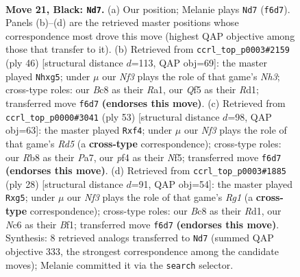 \documentclass[11pt]{article}
\begin{document}
\clearpage

\begin{figure}[p]\centering
\begin{subfigure}{0.46\textwidth}\centering
\resizebox{\linewidth}{!}{%
\newchessgame
\chessboard[
  setfen={1rb1r1k1/p1p2pp1/2n2n1p/p4q1P/2P2P1R/2P1P3/8/R1BQKBN1 b Q - 5 21},
  showmover=false,
  pgfstyle=straightmove, color=movearrow, markmove={f6-d7}
]}
\caption{}
\end{subfigure}\hfill
\begin{subfigure}{0.46\textwidth}\centering
\resizebox{\linewidth}{!}{%
\newchessgame
\chessboard[
  setfen={2bqr1k1/2p5/p1n4p/5pp1/1rp5/3p1NPN/P4PBP/R1QR2K1 w - - 2 24},
  showmover=false,
  pgfstyle=straightmove, color=movearrow, markmove={h3-g5}
]}
\caption{}
\end{subfigure}
\\[4pt]
\begin{subfigure}{0.46\textwidth}\centering
\resizebox{\linewidth}{!}{%
\newchessgame
\chessboard[
  setfen={2r3k1/ppq2pp1/4pn2/1PP2n1p/P2r1P2/BQ5P/2B3P1/4RRK1 b - - 2 27},
  showmover=false,
  pgfstyle=straightmove, color=movearrow, markmove={d4-f4}
]}
\caption{}
\end{subfigure}\hfill
\begin{subfigure}{0.46\textwidth}\centering
\resizebox{\linewidth}{!}{%
\newchessgame
\chessboard[
  setfen={r3k2r/1pqb1pp1/p2pp3/6bn/3QP3/2N2P2/PPP4P/1K1R1BR1 w kq - 0 15},
  showmover=false,
  pgfstyle=straightmove, color=movearrow, markmove={g1-g5}
]}
\caption{}
\end{subfigure}
\caption{\textbf{Move 21, Black: \texttt{Nd7}.} (a) Our position; Melanie plays \texttt{Nd7} (\texttt{f6d7}). Panels (b)--(d) are the retrieved master positions whose correspondence most drove this move (highest QAP objective among those that transfer to it). (b) Retrieved from \texttt{ccrl\_top\_p0003\#2159} (ply 46) [structural distance $d$=113, QAP obj=69]: the master played \texttt{Nhxg5}; under $\mu$ our \emph{Nf3} plays the role of that game's \emph{Nh3}; cross-type roles: our \emph{B}c8 as their \emph{R}a1, our \emph{Q}f5 as their \emph{R}d1; transferred move \texttt{f6d7} \textbf{(endorses this move)}. (c) Retrieved from \texttt{ccrl\_top\_p0000\#3041} (ply 53) [structural distance $d$=98, QAP obj=63]: the master played \texttt{Rxf4}; under $\mu$ our \emph{Nf3} plays the role of that game's \emph{Rd5} (a \textbf{cross-type} correspondence); cross-type roles: our \emph{R}b8 as their \emph{P}a7, our \emph{p}f4 as their \emph{N}f5; transferred move \texttt{f6d7} \textbf{(endorses this move)}. (d) Retrieved from \texttt{ccrl\_top\_p0003\#1885} (ply 28) [structural distance $d$=91, QAP obj=54]: the master played \texttt{Rxg5}; under $\mu$ our \emph{Nf3} plays the role of that game's \emph{Rg1} (a \textbf{cross-type} correspondence); cross-type roles: our \emph{B}c8 as their \emph{R}d1, our \emph{N}c6 as their \emph{B}f1; transferred move \texttt{f6d7} \textbf{(endorses this move)}. Synthesis: 8 retrieved analogs transferred to \texttt{Nd7} (summed QAP objective 333, the strongest correspondence among the candidate moves); Melanie committed it via the \texttt{search} selector.}
\label{fig:thought-m41}
\end{figure}
\end{document}
